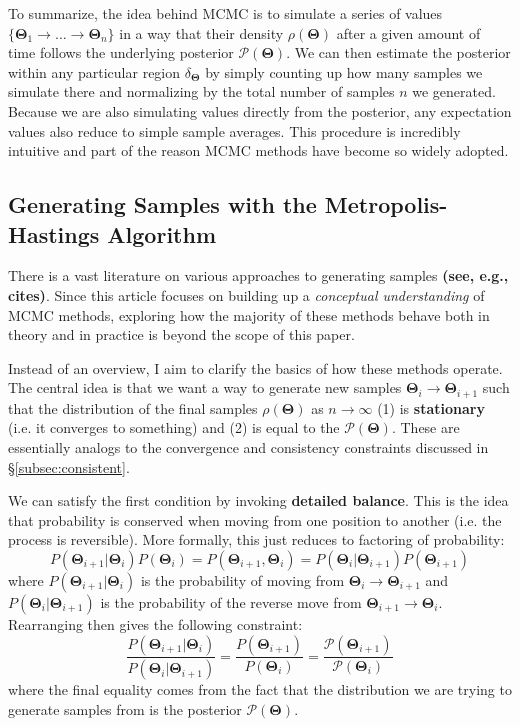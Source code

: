 \documentclass[12pt, titlepage]{article}
\newcommand{\params}{\ensuremath{\boldsymbol\Theta}}
\newcommand{\posterior}{\ensuremath{\mathcal{P}}}
\begin{document}
To summarize, the idea behind MCMC is to simulate a series of
values $\{ \params_1 \rightarrow \dots \rightarrow \params_n \}$
in a way that their density $\rho(\params)$ after a given amount
of time follows the underlying posterior $\posterior(\params)$. We can
then estimate the posterior within any particular region $\delta_{\params}$
by simply counting up how many samples we simulate there and normalizing by
the total number of samples $n$ we generated. Because we are also
simulating values directly from the posterior, any expectation values
also reduce to simple sample averages. This procedure is incredibly
intuitive and part of the reason MCMC methods have 
become so widely adopted.

\subsection{Generating Samples with the Metropolis-Hastings Algorithm} \label{subsec:mh}

There is a vast literature on various approaches to generating samples
\textbf{(see, e.g., cites)}. Since this article focuses on
building up a \textit{conceptual understanding} of MCMC methods, 
exploring how the majority of these methods behave both in theory and
in practice is beyond the scope of this paper.

Instead of an overview, I aim to clarify the basics of how these methods operate.
The central idea is that we want a way to generate new samples 
$\params_i \rightarrow \params_{i+1}$ such that the
distribution of the final samples $\rho(\params)$ as $n \rightarrow \infty$
(1) is \textbf{stationary} (i.e. it converges to something) and 
(2) is equal to the $\posterior(\params)$. These are essentially analogs
to the convergence and consistency constraints 
discussed in \S\ref{subsec:consistent}.

We can satisfy the first condition by invoking \textbf{detailed balance}.
This is the idea that probability is conserved when moving
from one position to another (i.e. the process is reversible). More formally,
this just reduces to factoring of probability:
\begin{equation}
    P(\params_{i+1}|\params_i) P(\params_i) 
    = P(\params_{i+1}, \params_i)
    = P(\params_i|\params_{i+1}) P(\params_{i+1}) 
\end{equation}
where $P(\params_{i+1}|\params_i)$ is the probability of moving
from $\params_i \rightarrow \params_{i+1}$ and $P(\params_{i}|\params_{i+1})$ 
is the probability of the reverse move from 
$\params_{i+1} \rightarrow \params_i$. 
Rearranging then gives the following constraint:
\begin{equation}
    \frac{P(\params_{i+1}|\params_i)}{P(\params_i|\params_{i+1})} 
    = \frac{P(\params_{i+1})}{P(\params_i)}
    = \frac{\posterior(\params_{i+1})}{\posterior(\params_i)}
\end{equation}
where the final equality comes from the fact that the distribution
we are trying to generate samples from is the posterior $\posterior(\params)$.
\end{document}
